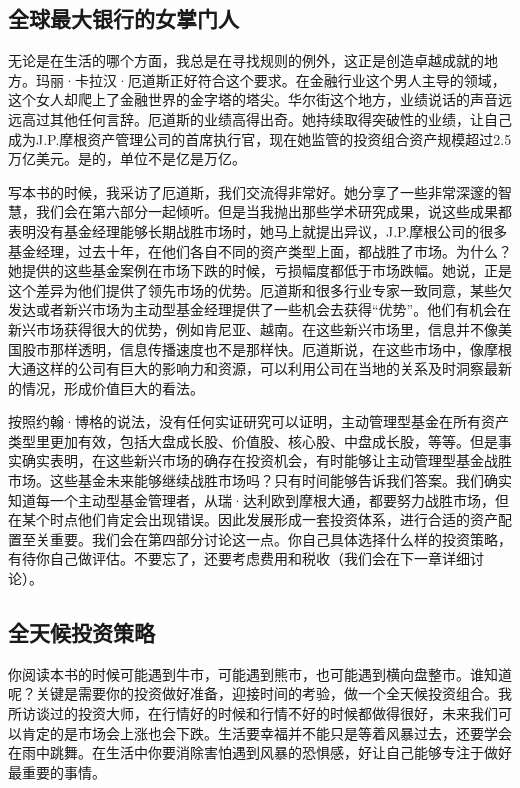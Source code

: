 \subsection{全球最大银行的女掌门人}

无论是在生活的哪个方面，我总是在寻找规则的例外，这正是创造卓越成就的地方。玛丽·卡拉汉·厄道斯正好符合这个要求。在金融行业这个男人主导的领域，这个女人却爬上了金融世界的金字塔的塔尖。华尔街这个地方，业绩说话的声音远远高过其他任何言辞。厄道斯的业绩高得出奇。她持续取得突破性的业绩，让自己成为J.P.摩根资产管理公司的首席执行官，现在她监管的投资组合资产规模超过2.5万亿美元。是的，单位不是亿是万亿。

写本书的时候，我采访了厄道斯，我们交流得非常好。她分享了一些非常深邃的智慧，我们会在第六部分一起倾听。但是当我抛出那些学术研究成果，说这些成果都表明没有基金经理能够长期战胜市场时，她马上就提出异议，J.P.摩根公司的很多基金经理，过去十年，在他们各自不同的资产类型上面，都战胜了市场。为什么？她提供的这些基金案例在市场下跌的时候，亏损幅度都低于市场跌幅。她说，正是这个差异为他们提供了领先市场的优势。厄道斯和很多行业专家一致同意，某些欠发达或者新兴市场为主动型基金经理提供了一些机会去获得“优势”。他们有机会在新兴市场获得很大的优势，例如肯尼亚、越南。在这些新兴市场里，信息并不像美国股市那样透明，信息传播速度也不是那样快。厄道斯说，在这些市场中，像摩根大通这样的公司有巨大的影响力和资源，可以利用公司在当地的关系及时洞察最新的情况，形成价值巨大的看法。

按照约翰·博格的说法，没有任何实证研究可以证明，主动管理型基金在所有资产类型里更加有效，包括大盘成长股、价值股、核心股、中盘成长股，等等。但是事实确实表明，在这些新兴市场的确存在投资机会，有时能够让主动管理型基金战胜市场。这些基金未来能够继续战胜市场吗？只有时间能够告诉我们答案。我们确实知道每一个主动型基金管理者，从瑞·达利欧到摩根大通，都要努力战胜市场，但在某个时点他们肯定会出现错误。因此发展形成一套投资体系，进行合适的资产配置至关重要。我们会在第四部分讨论这一点。你自己具体选择什么样的投资策略，有待你自己做评估。不要忘了，还要考虑费用和税收（我们会在下一章详细讨论）。

\subsection{全天候投资策略}

你阅读本书的时候可能遇到牛市，可能遇到熊市，也可能遇到横向盘整市。谁知道呢？关键是需要你的投资做好准备，迎接时间的考验，做一个全天候投资组合。我所访谈过的投资大师，在行情好的时候和行情不好的时候都做得很好，未来我们可以肯定的是市场会上涨也会下跌。生活要幸福并不能只是等着风暴过去，还要学会在雨中跳舞。在生活中你要消除害怕遇到风暴的恐惧感，好让自己能够专注于做好最重要的事情。

